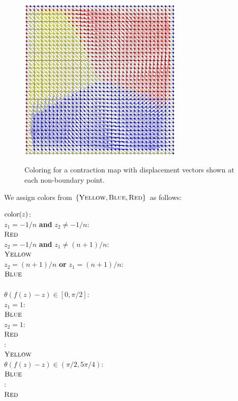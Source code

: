   \begin{figure}[h] 
    \caption{Coloring for a contraction map with displacement vectors shown at each non-boundary point.}
    \centering
    \includegraphics[width=0.7\textwidth]{ContractionToEOPL_example1_displacement}
    \label{fig:displacement}
  \end{figure}

  We assign colors from $\left\{ \textsc{Yellow}, \textsc{Blue}, \textsc{Red} \right\}$ as follows:
  \begin{algo}
    $\operatorname{color}(z)$:\+
    \\ \IfB $z_1 = -1/n$ \textbf{and} $z_2 \neq -1/n$:\+
    \\   \ReturnB $\textsc{Red}$\-
    \\ \ElseIfB $z_2 = -1/n$ \textbf{and} $z_1 \neq (n+1)/n$:\+
    \\   \ReturnB $\textsc{Yellow}$\-
    \\ \ElseIfB $z_2 = (n+1)/n$ \textbf{or} $z_1 = (n+1)/n$:\+
    \\   \ReturnB $\textsc{Blue}$\-
    \\
    \\ \IfB $\theta(f(z) - z) \in [0, \pi/2]$:\+
    \\   \IfB $z_1 = 1$:\+
    \\     \ReturnB $\textsc{Blue}$\-
    \\   \ElseIfB $z_2 = 1$:\+
    \\     \ReturnB $\textsc{Red}$\-
    \\   \ElseB:\+
    \\     \ReturnB $\textsc{Yellow}$\-\-
    \\ \ElseIfB $\theta(f(z) - z) \in (\pi/2, 5\pi/4)$:\+
    \\   \ReturnB $\textsc{Blue}$\-
    \\ \ElseIfB:\+
    \\   \ReturnB $\textsc{Red}$\-\-
  \end{algo}

